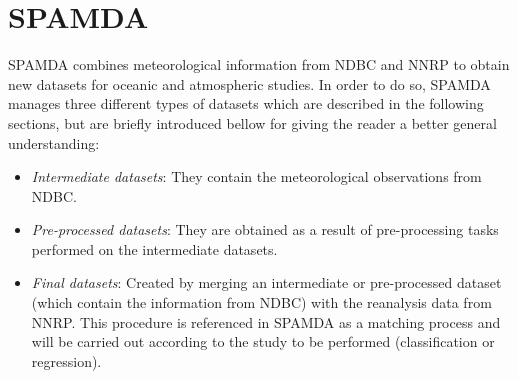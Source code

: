 \documentclass[energies,article,accept,moreauthors,pdftex]{Definitions/mdpi}
\begin{document}
		
		
	\section{SPAMDA}\label{sec:SPAMDA}
		
		SPAMDA combines meteorological information from NDBC and NNRP to obtain new datasets for oceanic and atmospheric studies. In order to do so, SPAMDA manages three different types of datasets which are described in the following sections, but are briefly introduced bellow for giving the reader a better general understanding:
			\begin{itemize}
				\item \textit{Intermediate datasets}: They contain the meteorological observations from NDBC.
				\item \textit{Pre-processed datasets}: They are obtained as a result of pre-processing tasks performed on the intermediate datasets.
				\item \textit{Final datasets}: Created by merging an intermediate or pre-processed dataset (which contain the information from NDBC) with the reanalysis data from NNRP. This procedure is referenced in SPAMDA as a matching process and will be carried out according to the study to be performed (classification or regression).
			\end{itemize}
		
\end{document}
